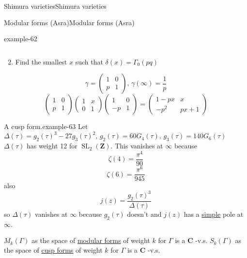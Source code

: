 \documentclass[10pt,]{book}
\numberwithin{equation}{section}
\newcommand{\ZZ}{\mathbf{Z}}
\newcommand{\CC}{\mathbf{C}}
\DeclareMathOperator{\SL}{SL}
\newcommand{\amp}{&}
\begin{document}
\begin{chapterptx}{Shimura varieties}{}{Shimura varieties}{}{}
\begin{sectionptx}{Modular forms (Asra)}{}{Modular forms (Asra)}{}{}
\begin{example}{}{example-62}
\begin{enumerate}
\begin{equation*}
\end{equation*}
%
\item\hypertarget{li-265}{}Find the smallest \(x\) such that \(\delta(x) = \Gamma_0(pq)\)%
\end{enumerate}
%
\begin{equation*}
\gamma = \begin{pmatrix} 1\amp 0 \\ p \amp 1 \end{pmatrix},\, \gamma(\infty) = \frac 1p
\end{equation*}
%
\begin{equation*}
\begin{pmatrix} 1\amp 0 \\ p \amp 1 \end{pmatrix} \begin{pmatrix} 1\amp x \\ 0 \amp 1 \end{pmatrix} \begin{pmatrix} 1\amp 0 \\ -p \amp 1 \end{pmatrix}  = \begin{pmatrix} 1 - px \amp x  \\ -p^2 \amp px+ 1 \end{pmatrix}
\end{equation*}
%
\end{example}
\begin{example}{A cusp form.}{example-63}%
\hypertarget{p-1066}{}%
Let \(\Delta(\tau) = g_2(\tau)^3 - 27g_3(\tau)^2,\,g_2(\tau) = 60G_4(\tau),\,g_3(\tau) =140G_6(\tau)\) \(\Delta(\tau)\) has weight 12 for \(\SL_2(\ZZ)\). This vanishes at \(\infty\) because%
\begin{equation*}
\zeta(4) = \frac{\pi^4}{90}
\end{equation*}
%
\begin{equation*}
\zeta(6) = \frac{\pi^6}{945}
\end{equation*}
also%
\begin{equation*}
j(z) = \frac{g_2(\tau)^3}{\Delta(\tau)}
\end{equation*}
so \(\Delta(\tau)\) vanishes at \(\infty\) because \(g_2(\tau)\) doesn't  and \(j(z)\) has a  \hyperref[def-simple-av]{simple} pole at \(\infty\).%
\end{example}
\hypertarget{p-1067}{}%
\(M_k(\Gamma)\) as the space of \hyperref[def-buntes-mfs]{modular forms} of weight \(k\) for \(\Gamma\) is a \(\CC\) -v.s. \(S_k(\Gamma)\) as the space of \hyperref[def-buntes-cusp-forms]{cusp forms} of weight \(k\) for \(\Gamma\) is a \(\CC\) -v.s.%

\end{sectionptx}
\end{chapterptx}
\end{document}
